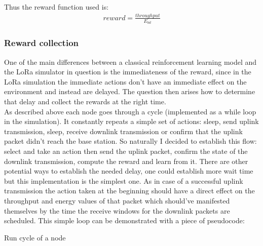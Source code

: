 Thus the reward function used is:
\begin{align}
    reward = \frac{throughput}{E_{bit}}
\end{align}

\subsubsection{Reward collection}

One of the main differences between a classical reinforcement
learning model and the LoRa simulator in question is the immediateness of the reward, since in the LoRa simulation the immediate actions don't have an immediate effect on the environment and instead are delayed. The question then arises how to determine that delay and collect the rewards at the right time. \\

As described above each node goes through a cycle (implemented 
as a while loop in the simulation). It constantly repeats
a simple set of actions: sleep, send uplink transmission, sleep,
receive downlink transmission or confirm that the uplink 
packet didn't reach the base station. So naturally I decided to establish this flow:
select and take an action then send the uplink packet,
confirm the state of the downlink transmission, compute
the reward and learn from it. There are other potential 
ways to establish the needed delay, one could 
establish more wait time but this implementation is the 
simplest one. As in case of a successful uplink transmission
the action taken at the beginning should have a direct effect on the throughput and energy values of that packet 
which should've manifested themselves by the time the receive
windows for the downlink packets are scheduled. This simple loop 
can be demonstrated with a piece of pseudocode:\\

\begin{algorithm}[H]
\SetAlgoLined
 \caption{Run cycle of a node}
\end{algorithm}

